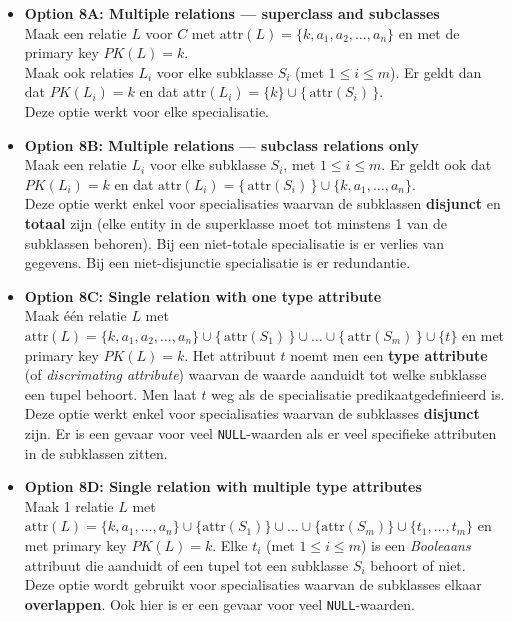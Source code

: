 \begin{itemize}
	\item \textbf{Option 8A: Multiple relations --- superclass and subclasses}\\
	Maak een relatie $L$ voor $C$ met $\text{attr}(L) = \{k, a_1, a_2, \dots, a_n\}$ en met de primary key $\mathit{PK}(L) = k$.\\
	Maak ook relaties $L_i$ voor elke subklasse $S_i$ (met $1 \leqslant i \leqslant m$). Er geldt dan dat $\mathit{PK}(L_i) = k$ en dat $\text{attr}(L_i) = \{k\} \cup \{\, \text{attr}(S_i)\, \}$.\\
	Deze optie werkt voor elke specialisatie.

	\item \textbf{Option 8B: Multiple relations --- subclass relations only}\\
	Maak een relatie $L_i$ voor elke subklasse $S_i$, met $1 \leqslant i \leqslant m$. Er geldt ook dat $\mathit{PK}(L_i) = k$ en dat $\text{attr}(L_i) = \{\, \text{attr}(S_i) \,\} \cup \{k, a_1, \dots, a_n\}$.\\
	Deze optie werkt enkel voor specialisaties waarvan de subklassen \textbf{disjunct} en \textbf{totaal} zijn (elke entity in de superklasse moet tot minstens 1 van de subklassen behoren). Bij een niet-totale specialisatie is er verlies van gegevens. Bij een niet-disjunctie specialisatie is er redundantie.
  
	\item \textbf{Option 8C: Single relation with one type attribute}\\
	Maak \'e\'en relatie $L$ met $\text{attr}(L) = \{k, a_1, a_2, \dots, a_n\} \cup \{\, \text{attr}(S_1) \,\} \cup \dots \cup \{\, \text{attr}(S_m) \,\} \cup \{t\}$ en met primary key $\mathit{PK}(L) = k$. Het attribuut $t$ noemt men een \textbf{type attribute} (of \textit{discrimating attribute}) waarvan de waarde aanduidt tot welke subklasse een tupel behoort. Men laat $t$ weg als de specialisatie predikaatgedefinieerd is.\\
	Deze optie werkt enkel voor specialisaties waarvan de subklasses \textbf{disjunct} zijn. Er is een gevaar voor veel \texttt{NULL}-waarden als er veel specifieke attributen in de subklassen zitten.

	\item \textbf{Option 8D: Single relation with multiple type attributes}\\
	Maak 1 relatie $L$ met $\text{attr}(L) = \{k, a_1, \dots, a_n\} \cup \{\text{attr}(S_1)\} \cup \dots \cup \{\text{attr}(S_m)\} \cup \{t_1, \dots, t_m\}$ en met primary key $\mathit{PK}(L) = k$. Elke $t_i$ (met $1 \leqslant i \leqslant m$) is een \textit{Booleaans} attribuut die aanduidt of een tupel tot een subklasse $S_{i}$ behoort of niet.\\
	Deze optie wordt gebruikt voor specialisaties waarvan de subklasses elkaar \textbf{overlappen}. Ook hier is er een gevaar voor veel \texttt{NULL}-waarden.
\end{itemize}

